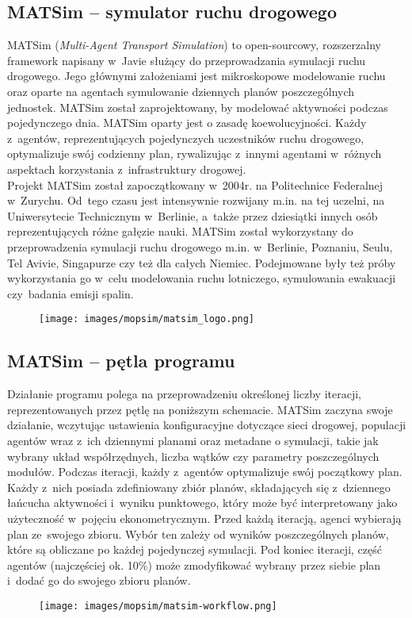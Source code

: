 \subsection{MATSim -- symulator ruchu drogowego}
MATSim (\textit{Multi-Agent Transport Simulation}) to open-sourcowy, rozszerzalny framework napisany w~Javie służący do przeprowadzania symulacji ruchu drogowego. Jego głównymi założeniami jest mikroskopowe modelowanie ruchu oraz oparte na agentach symulowanie dziennych planów poszczególnych jednostek. MATSim został zaprojektowany, by modelować aktywności podczas pojedynczego dnia. MATSim oparty jest o zasadę koewolucyjności. Każdy z~agentów, reprezentujących pojedynczych uczestników ruchu drogowego, optymalizuje swój codzienny plan, rywalizując z~innymi agentami w~różnych aspektach korzystania z~infrastruktury drogowej.\\
Projekt MATSim został zapoczątkowany w~2004r. na Politechnice Federalnej w~Zurychu.\cite{matsim} Od~tego czasu jest intensywnie rozwijany m.in. na tej uczelni, na Uniwersytecie Technicznym w~Berlinie, a~także przez dziesiątki innych osób reprezentujących różne gałęzie nauki. MATSim został wykorzystany do przeprowadzenia symulacji ruchu drogowego m.in. w~Berlinie, Poznaniu, Seulu, Tel Avivie, Singapurze czy też dla całych Niemiec. Podejmowane były też próby wykorzystania go w~celu modelowania ruchu lotniczego, symulowania ewakuacji czy~badania emisji spalin.
    \begin{figure}[h]
        \texttt{[image: images/mopsim/matsim\_logo.png]}
    \end{figure}
\subsection{MATSim -- pętla programu}
Działanie programu polega na przeprowadzeniu określonej liczby iteracji, reprezentowanych przez pętlę na poniższym schemacie. MATSim zaczyna swoje działanie, wczytując ustawienia konfiguracyjne dotyczące sieci drogowej, populacji agentów wraz z~ich dziennymi planami oraz metadane o symulacji, takie jak wybrany układ współrzędnych, liczba wątków czy parametry poszczególnych modułów. Podczas iteracji, każdy z~agentów optymalizuje swój początkowy plan. Każdy z~nich posiada zdefiniowany zbiór planów, składających się z~dziennego łańcucha aktywności i~wyniku punktowego, który może być interpretowany jako użyteczność w~pojęciu ekonometrycznym. Przed każdą iteracją, agenci wybierają plan ze~swojego zbioru. Wybór ten zależy od wyników poszczególnych planów, które są obliczane po każdej pojedynczej symulacji. Pod koniec iteracji, część agentów (najczęściej ok. 10\%) może zmodyfikować wybrany przez siebie plan i~dodać go do swojego zbioru planów. 
    \begin{figure}[h]
        \texttt{[image: images/mopsim/matsim-workflow.png]}
    \end{figure}
\newpage
